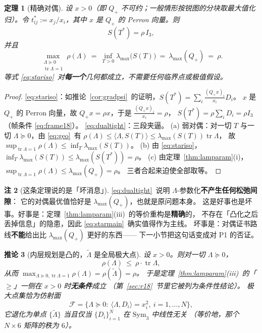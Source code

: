 \documentclass[UTF8,11pt]{ctexart}
\newtheorem{theorem}{定理}[section]
\newtheorem{corollary}[theorem]{推论}
\theoremstyle{definition}
\newtheorem{remark}[theorem]{注}
\newcommand{\Lam}{\Lambda}
\newcommand{\tr}{\operatorname{tr}}
\begin{document}
\begin{theorem}[精确对偶]\label{thm:exactdual}
设 $x>0$（即 $Q_+$ 不可约；一般情形按锐图的分块取最大值化归）。令
$t^*_{ij}:=x_j/x_i$，其中 $x$ 是 $Q_+$ 的 Perron 向量。则
\begin{equation}\label{eq:stariso}
S(T^*)=\rho\,I_3 ,
\end{equation}
并且
\begin{equation}\label{eq:dualtight}
\max_{\substack{\Lam\succeq0\\ \tr\Lam=1}}\rho(\Lam)
\ =\ \inf_{T>0}\lambda_{\max}\!\bigl(S(T)\bigr)
\ =\ \lambda_{\max}(Q_+)\ =\ \rho .
\end{equation}
等式 \eqref{eq:stariso}~对\textbf{每一个}几何都成立，不需要任何临界点或极值假设。
\end{theorem}

\begin{proof}
\eqref{eq:stariso}：如推论~\ref{cor:gradpsi}~的证明，$S(T^*)=\sum_i\frac{(Q_+x)_i}{x_i}D_i$。
$x$ 是 $Q_+$ 的 Perron 向量，故 $Q_+x=\rho x$，于是 $\frac{(Q_+x)_i}{x_i}=\rho$，
$S(T^*)=\rho\sum_iD_i=\rho I_3$（帧条件 \eqref{eq:frame18}）。
\eqref{eq:dualtight}：三段夹逼。
(a) 弱对偶：对一切 $T$ 与一切 $\Lam\succeq0$，由 \eqref{eq:geo}~有
$\rho(\Lam)\le\langle\Lam,S(T)\rangle\le\lambda_{\max}(S(T))\tr\Lam$，
故 $\sup_{\tr\Lam=1}\rho(\Lam)\le\inf_T\lambda_{\max}(S(T))$。
(b) 由 \eqref{eq:stariso}，$\inf_T\lambda_{\max}(S(T))\le\lambda_{\max}(S(T^*))=\rho$。
(c) 由定理~\ref{thm:lamparam}(i)，$\sup_{\tr\Lam=1}\rho(\Lam)\le\lambda_{\max}(Q_+)=\rho$。
三者合起来迫使全部取等。
\end{proof}

\begin{remark}[这条定理说的是「坏消息」]\label{rmk:dualtight}
\eqref{eq:dualtight}~说明 $\Lam$-参数化\textbf{不产生任何松弛间隙}：
它的对偶最优值恰好是 $\lambda_{\max}(Q_+)$，也就是原问题本身。
这是好事也是坏事。好事是：定理~\ref{thm:lamparam}(iii)~的等价重构是\textbf{精确}的，
不存在「凸化之后丢掉信息」的隐患，因此 \eqref{eq:starmain}~确实值得作为主线。
坏事是：对偶证书路线\textbf{不能}给出比 $\lambda_{\max}(Q_+)$ 更好的东西——
下一小节把这句话变成对 P1 的否证。
\end{remark}

\begin{corollary}[内层规划是凸的，$\tilde\Lam$ 是全局极大点]\label{cor:argmax}
设 $x>0$。则对一切 $\Lam\succeq0$，
\begin{equation}\label{eq:tangent}
\rho(\Lam)\ \le\ \rho\cdot\tr\Lam ,
\end{equation}
从而 $\max_{\Lam\succeq0,\tr\Lam=1}\rho(\Lam)=\rho(\tilde\Lam)=\rho$。
于是定理~\ref{thm:lamparam}(iii)~的「$\ge$」一侧在 $x>0$ 时\textbf{无条件}成立
（第~\ref{sec:r18}~节里它被列为条件性结论）。
极大点集恰为仿射面
\begin{equation}\label{eq:face}
\mathcal F=\{\Lam\succeq0:\ \langle\Lam,D_i\rangle=x_i^2,\ i=1,\dots,N\},
\end{equation}
它退化为单点 $\{\tilde\Lam\}$ 当且仅当 $\{D_i\}_{i=1}^N$ 在 $\mathrm{Sym}_3$ 中线性无关
（等价地，那个 $N\times6$ 矩阵的秩为 $6$）。
\end{corollary}
\end{document}

